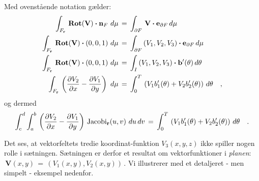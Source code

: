 \begin{theorem} \label{thmStokesPlan}
Med ovenstående notation gælder:
\begin{equation}
\begin{aligned}
\int_{F_{\mathbf{r}}}\, \operatorname{\mathbf{Rot}}({\bf{V}})\bm{\cdot} {\bf{n}}_{F} \,
\,d\mu \, &= \, \int_{\partial F} \, {\bf{V}}
\bm{\cdot} {\bf{e}}_{\partial F} \, d\mu \\
\int_{F_{\mathbf{r}}}\, \operatorname{\mathbf{Rot}}({\bf{V}})\bm{\cdot} (0, 0, 1) \,
\,d\mu \, &= \, \int_{\partial F} \, (V_{1}, V_{2}, V_{3})
\bm{\cdot} {\bf{e}}_{\partial F} \, d\mu \\
\int_{F_{\mathbf{r}}}\, \operatorname{\mathbf{Rot}}({\bf{V}})\bm{\cdot} (0, 0, 1) \,
\,d\mu \, &= \, \int_{I} \, (V_{1}, V_{2}, V_{3})
\bm{\cdot} {\mathbf{b}}'(\theta)\, d\theta \\
\int_{F_{\mathbf{r}}}\, \left( \frac{\partial V_{2}}{\partial x} -  \frac{\partial V_{1}}{\partial y}\right) \,
\,d\mu \, &= \, \int_{0}^{T} \,\left( V_{1}b_{1}'(\theta) +  V_{2}b_{2}'(\theta) \right) \,d\theta \quad ,
\end{aligned}
\end{equation}
og dermed
\begin{equation} \label{eqStokesPlan}
\int_{c}^{d}\int_{a}^{b}\, \left( \frac{\partial V_{2}}{\partial x} -  \frac{\partial V_{1}}{\partial y}\right) \, \operatorname{Jacobi}_{\mathbf{r}}(u,v)\,
\,du \, dv \, = \, \int_{0}^{T} \, \left( V_{1}b_{1}'(\theta) +  V_{2}b_{2}'(\theta)\right) \,d\theta \quad .
\end{equation}
\end{theorem}

\begin{remark}
Det ses, at vektorfeltets tredie koordinat-funktion $V_{3}(x,y,z)$ ikke spiller nogen rolle i sætningen. Sætningen er derfor et resultat om vektorfunktioner i {\em{planen}}: $\,\mathbf{V}(x,y) \, = \, \left(V_{1}(x,y), V_{2}(x,y)\right)\,$. Vi illustrerer med et detaljeret - men simpelt - eksempel nedenfor.
\end{remark}



